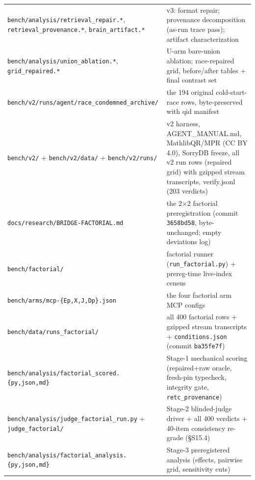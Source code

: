 \documentclass[10pt]{article}
\newcommand{\code}[1]{\texttt{#1}}
\begin{document}
\begin{center}
\begin{tabular}{@{}p{}p{}@{}}
\code{bench/analysis/retrieval\_repair.*}, \code{retrieval\_provenance.*}, \code{brain\_artifact.*} & v3: format repair; provenance decomposition (as-run trace pass); artifact characterization \\
\code{bench/analysis/union\_ablation.*}, \code{grid\_repaired.*} & U-arm bare-union ablation; race-repaired grid, before/after tables + final contrast set \\
\code{bench/v2/runs/agent/race\_condemned\_archive/} & the 194 original cold-start-race rows, byte-preserved with qid manifest \\
\code{bench/v2/} + \code{bench/v2/data/} + \code{bench/v2/runs/} & v2 harness, AGENT\_MANUAL.md, MathlibQR/MPR (CC BY 4.0), SorryDB freeze, all v2 run rows (repaired grid) with gzipped stream transcripts, verify.jsonl (203 verdicts) \\
\code{docs/research/BRIDGE-FACTORIAL.md} & the 2$\times$2 factorial preregistration (commit \code{3658bd58}, byte-unchanged; empty deviations log) \\
\code{bench/factorial/} & factorial runner (\code{run\_factorial.py}) + prereg-time live-index census \\
\code{bench/arms/mcp-\{Ep,X,J,Dp\}.json} & the four factorial arm MCP configs \\
\code{bench/data/runs\_factorial/} & all 400 factorial rows + gzipped stream transcripts + \code{conditions.json} (commit \code{ba35fe7f}) \\
\code{bench/analysis/factorial\_scored.\{py,json,md\}} & Stage-1 mechanical scoring (repaired+raw oracle, fresh-pin typecheck, integrity gate, \code{retc\_provenance}) \\
\code{bench/analysis/judge\_factorial\_run.py} + \code{judge\_factorial/} & Stage-2 blinded-judge driver + all 400 verdicts + 40-item consistency re-grade (\S S15.4) \\
\code{bench/analysis/factorial\_analysis.\{py,json,md\}} & Stage-3 preregistered analysis (effects, pairwise grid, sensitivity cuts) \\
\bottomrule
\end{tabular}
\end{center}
\end{document}
